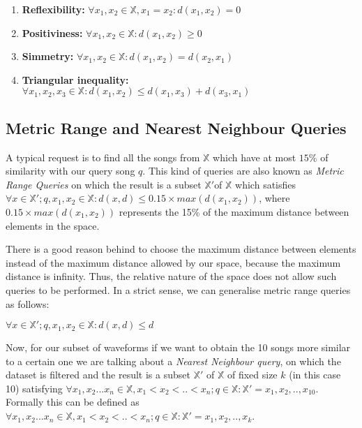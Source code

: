 \begin{enumerate}
\item{\textbf{Reflexibility:} $\forall x_1,x_2 \in \mathbb{X}, x_1=x_2 : d(x_1,x_2) = 0$}
\item{\textbf{Positiviness:} $\forall x_1,x_2 \in \mathbb{X} : d(x_1,x_2) \geq 0$}
\item{\textbf{Simmetry:} $\forall x_1,x_2 \in \mathbb{X} :d(x_1,x_2) = d(x_2,x_1)$}
\item{\textbf{Triangular inequality:} $\forall x_1,x_2,x_3 \in \mathbb{X} :d(x_1,x_2) \leq d(x_1,x_3) + d(x_3,x_1)$}
\end{enumerate}

\subsection{Metric Range and Nearest Neighbour Queries}
A typical request is to find all the songs from $\mathbb{X}$ which have at most $15\%$ of similarity with our query song $q$. This 
kind of queries are also known as \emph{Metric Range Queries} on which the result is a subset $\mathbb{X}'$of $\mathbb{X}$ which satisfies 
$\forall x \in \mathbb{X}'; q, x_1, x_2 \in \mathbb{X} : d(x,d) \leq  0.15 \times max(d(x_1,x_2))$, where $0.15 \times max(d(x_1,x_2))$ represents
the 15\% of the maximum distance between elements in the space. 

There is a good reason behind to choose the maximum distance between elements instead of the maximum distance allowed by our space,
because the maximum distance is infinity. Thus, the relative nature of the space does not allow such queries to be performed. In a strict
sense, we can generalise metric range queries as follows:

$\forall x \in \mathbb{X}'; q, x_1, x_2 \in \mathbb{X} : d(x,d) \leq d$

Now, for our subset of waveforms if we want to obtain the 10 songs more similar to a certain one we are talking about
a \emph{Nearest Neighbour query}, on which the dataset is filtered and the result is a subset $\mathbb{X}'$ of $\mathbb{X}$ of fixed size $k$ (in 
this case 10) satisfying $\forall x_1, x_2... x_n \in \mathbb{X}, x_1 < x_2 < .. < x_n ; q \in \mathbb{X} : \mathbb{X}' = {x_1, x_2, .., x_{10} }$.
Formally this can be defined as $\forall x_1, x_2... x_n \in \mathbb{X}, x_1 < x_2 < .. < x_n; q \in \mathbb{X} : \mathbb{X}' = {x_1, x_2, .., x_k }$.

